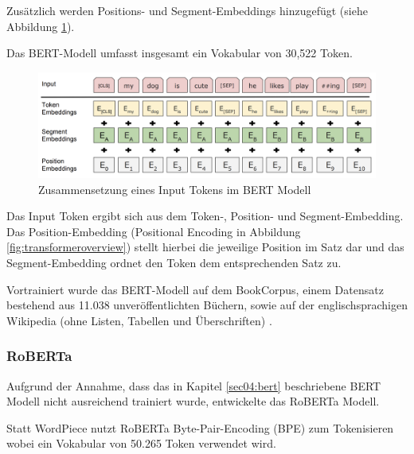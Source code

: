 Zusätzlich werden Positions- und Segment-Embeddings hinzugefügt (siehe Abbildung \ref{fig:bert_tokenizierung}).

Das BERT-Modell umfasst insgesamt ein Vokabular von 30,522 Token. 

\begin{figure}[htbp]
    \begin{center}
        \includegraphics[width=\linewidth]{static/bert_tokenizierung.png}
        \caption{\label{fig:bert_tokenizierung} Zusammensetzung eines Input Tokens im BERT Modell \cite{devlin2019}}
    \end{center}
\end{figure}

Das Input Token ergibt sich aus dem Token-, Position- und Segment-Embedding. Das Position-Embedding (Positional Encoding in Abbildung \ref{fig:transformeroverview}) 
stellt hierbei die jeweilige Position im Satz dar und das Segment-Embedding ordnet den Token dem entsprechenden Satz zu.

Vortrainiert wurde das BERT-Modell auf dem BookCorpus, einem Datensatz bestehend aus 11.038 unveröffentlichten Büchern, sowie auf der englischsprachigen Wikipedia 
(ohne Listen, Tabellen und Überschriften) \cite{DBLP:journals/corr/abs-1810-04805}.

\subsubsection{RoBERTa} \label{sec04:roberta}

Aufgrund der Annahme, dass das in Kapitel \ref{sec04:bert} beschriebene BERT Modell nicht ausreichend trainiert wurde, entwickelte 
\cite{DBLP:journals/corr/abs-1907-11692} das RoBERTa Modell.

Statt WordPiece nutzt RoBERTa Byte-Pair-Encoding (BPE) zum Tokenisieren wobei ein Vokabular von 50.265 Token verwendet wird.

